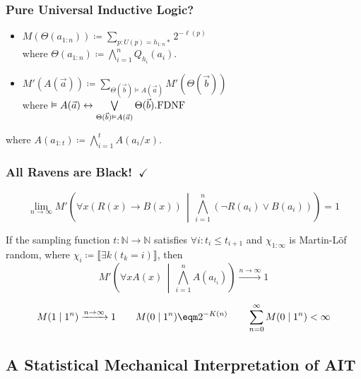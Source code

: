 \documentclass[UTF8,11pt,colorlinks,compress,openany]{beamer}%
\begin{document}
\begin{frame}\frametitle{Pure Universal Inductive Logic?}
\setlength\abovedisplayskip{0pt}
\setlength\belowdisplayskip{0pt}
\begin{block}{}
\begin{itemize}
\item $M(\Theta(a_{1:n}))\coloneqq \sum\limits_{p:U(p)=h_{1:n}*}2^{-\ell(p)}$\\
where $\Theta(a_{1:n})\coloneqq \bigwedge\limits_{i=1}^n Q_{h_i}(a_i)$.
\item $M'\left(A(\vec{a})\right)\coloneqq \sum\limits_{\Theta(\vec{b})\vDash A(\vec{a})} M'(\Theta(\vec{b}))$\\
where
$\vDash A(\vec{a})\leftrightarrow\bigvee\limits_{\Theta(\vec{b}) \vDash A(\vec{a})}\Theta(\vec{b}). \hfill\text{FDNF}$
\end{itemize}
\end{block}
\centerline{}
where $A(a_{1:t})\coloneqq \bigwedge\limits_{i=1}^t A(a_i/x)$.
\end{frame}

\begin{frame}\frametitle{All Ravens are Black!~$\checkmark$}
	\begin{theorem}
		\[\lim\limits_{n\to\infty} M'\left(\forall x(R(x)\to B(x))\,\middle|\,\bigwedge\limits_{i=1}^n (\neg R(a_i)\vee B(a_i))\right)=1\]
	\end{theorem}
	\begin{theorem}
		If the sampling function $t:\mathbb{N}\to\mathbb{N}$ satisfies $\forall i: t_i\leq t_{i+1}$ and $\chi_{1:\infty}$ is Martin-L\"of random, where $\chi_i\coloneqq \llbracket\exists k(t_k=i)\rrbracket$, then
		\[M'\left(\forall x A(x)\,\middle|\,\bigwedge\limits_{i=1}^n A(a_{t_i})\right)\xrightarrow{n\to\infty}1\]
	\end{theorem}
	\[M(1\mid 1^n)\xrightarrow{n\to\infty}1\qquad M(0\mid 1^n)\eqm 2^{-K(n)}\qquad\sum\limits_{n=0}^\infty M(0\mid 1^n)<\infty\]
\end{frame}

\subsection{A Statistical Mechanical Interpretation of AIT}
\end{document}
